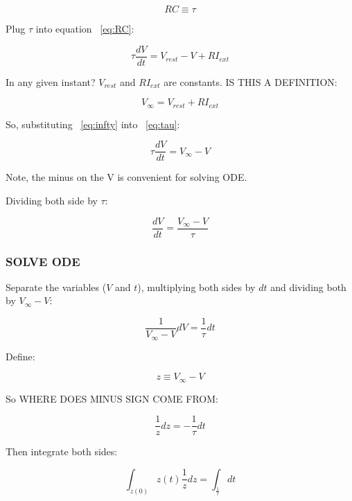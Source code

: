 \documentclass[../doc.tex]{subfiles}
\begin{document}
\begin{equation}
RC \equiv \tau
\end{equation} 

Plug $\tau$ into equation ~\ref{eq:RC}:

\begin{equation}\label{eq:tau}
\tau \frac{dV}{dt} = V_{rest} - V + RI_{ext}
\end{equation} 

In any given instant? $V_{rest}$ and $RI_{ext}$ are constants. IS THIS A DEFINITION:

\begin{equation}\label{eq:infty}
V_{\infty} = V_{rest} + RI_{ext}
\end{equation} 

So, substituting ~\ref{eq:infty} into ~\ref{eq:tau}:

\begin{equation}
\tau \frac{dV}{dt} = V_{\infty} - V
\end{equation} 

Note, the minus on the V is convenient for solving ODE.

Dividing both side by $\tau$:

\begin{equation}
\frac{dV}{dt} = \frac{V_{\infty} - V}{\tau}
\end{equation} 

\subsubsection{SOLVE ODE}

Separate the variables ($V$ and $t$), multiplying both sides by $dt$ and dividing both by $V_{\infty} - V$:

\begin{equation}
\frac{1}{V_{\infty} - V} dV =  \frac{1}{\tau} dt
\end{equation}

Define:

\begin{equation}
z \equiv V_{\infty} - V
\end{equation}

So WHERE DOES MINUS SIGN COME FROM:

\begin{equation}
\frac{1}{z} dz =  - \frac{1}{\tau} dt
\end{equation}

Then integrate both sides:

\begin{equation}
\int_{z(0)}{z(t)} \frac{1}{z} dz =   \int_ \frac{1}{\tau} dt
\end{equation}
\end{document}
